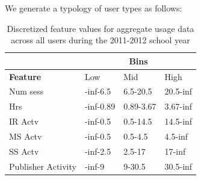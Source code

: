 \documentclass{acm_proc_article-sp}
\begin{document}
We generate a typology of user types as follows:

\begin{table}
\caption{Discretized feature values for aggregate usage data across all users during the 2011-2012 school year}
\label{aggfeaturebins}
\begin{tabular}{|l|l|l|l|} 
\hline
& \multicolumn{3}{c|}{\textbf{Bins}}  \\ \hline
\textbf{Feature} & Low & Mid & High \\ \hline
Num sess & -inf-6.5 & 6.5-20.5 & 20.5-inf \\ \hline
Hrs & -inf-0.89 &0.89-3.67 & 3.67-inf \\ \hline
IR Actv & -inf-0.5 & 0.5-14.5 & 14.5-inf \\ \hline
MS Actv & -inf-0.5 & 0.5-4.5 & 4.5-inf \\ \hline
SS Actv & -inf-2.5 & 2.5-17 & 17-inf \\ \hline
Publisher Activity & -inf-9 & 9-30.5 & 30.5-inf \\ \hline
\end{tabular}
\end{table}
\end{document}
